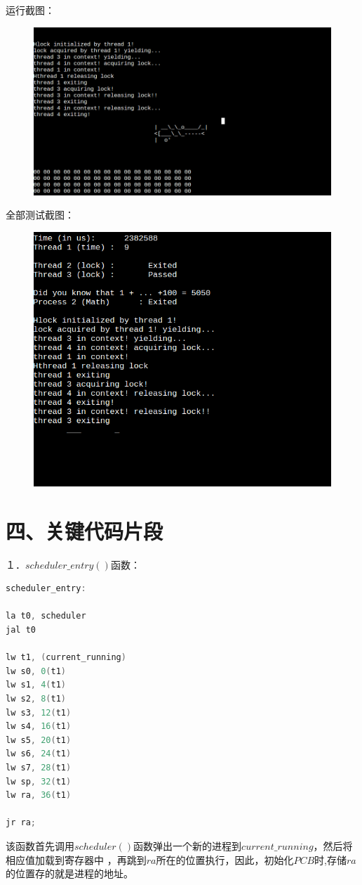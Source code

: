 \documentclass[UTF8,noindent]{ctexart}
\begin{document}
运行截图：
\begin{figure}[H]
	\includegraphics[scale=0.5]{fig/3.png}
\end{figure}
全部测试截图：
\begin{figure}[H]
	\includegraphics[scale=0.5]{fig/4.png}
\end{figure}

\section*{四、关键代码片段}

１．$scheduler\_entry()$函数：
\begin{lstlisting}[language =c]
scheduler_entry:

la t0, scheduler
jal t0

lw t1, (current_running)
lw s0, 0(t1)
lw s1, 4(t1)
lw s2, 8(t1)
lw s3, 12(t1)
lw s4, 16(t1)
lw s5, 20(t1)
lw s6, 24(t1)
lw s7, 28(t1)
lw sp, 32(t1)
lw ra, 36(t1)

jr ra;
\end{lstlisting}
该函数首先调用$scheduler()$函数弹出一个新的进程到$current\_running$，然后将相应值加载到寄存器中
，再跳到$ra$所在的位置执行，因此，初始化$PCB$时,存储$ra$的位置存的就是进程的地址。
\end{document}
